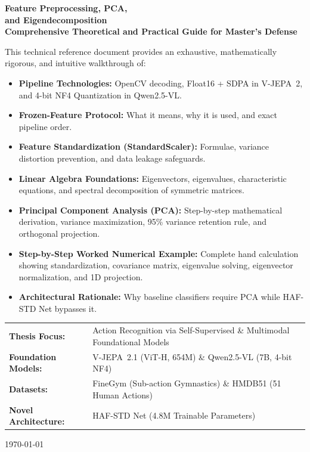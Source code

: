 \documentclass[11pt, a4paper]{article}
\begin{document}
\begin{titlepage}
\centering
\vspace*{0.5cm}
{\Huge \textbf{\color{darkblue}Feature Preprocessing, PCA,\\[0.3em]and Eigendecomposition}}\\[0.6cm]
{\Large \textbf{\color{medblue}Comprehensive Theoretical and Practical Guide for Master's Defense}}\\[1.2cm]

\begin{explainbox}
This technical reference document provides an exhaustive, mathematically rigorous, and intuitive walkthrough of:
\begin{itemize}[leftmargin=1.2em]
    \item \textbf{Pipeline Technologies:} OpenCV decoding, Float16 + SDPA in V-JEPA~2, and 4-bit NF4 Quantization in Qwen2.5-VL.
    \item \textbf{Frozen-Feature Protocol:} What it means, why it is used, and exact pipeline order.
    \item \textbf{Feature Standardization (StandardScaler):} Formulae, variance distortion prevention, and data leakage safeguards.
    \item \textbf{Linear Algebra Foundations:} Eigenvectors, eigenvalues, characteristic equations, and spectral decomposition of symmetric matrices.
    \item \textbf{Principal Component Analysis (PCA):} Step-by-step mathematical derivation, variance maximization, 95\% variance retention rule, and orthogonal projection.
    \item \textbf{Step-by-Step Worked Numerical Example:} Complete hand calculation showing standardization, covariance matrix, eigenvalue solving, eigenvector normalization, and 1D projection.
    \item \textbf{Architectural Rationale:} Why baseline classifiers require PCA while HAF-STD Net bypasses it.
\end{itemize}
\end{explainbox}

\vspace{1.5cm}
\begin{tabular}{ll}
\textbf{Thesis Focus:} & Action Recognition via Self-Supervised \& Multimodal Foundational Models \\
\textbf{Foundation Models:} & V-JEPA~2.1 (ViT-H, 654M) \& Qwen2.5-VL (7B, 4-bit NF4) \\
\textbf{Datasets:} & FineGym (Sub-action Gymnastics) \& HMDB51 (51 Human Actions) \\
\textbf{Novel Architecture:} & HAF-STD Net (4.8M Trainable Parameters) \\
\end{tabular}

\vfill
{\large \today}
\end{titlepage}
\end{document}
